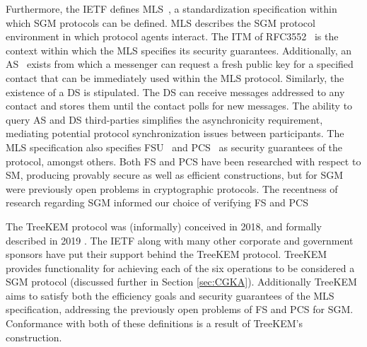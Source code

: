 \documentclass[runningheads]{llncs}
\newcommand{\Abrev}[1]{\gls{#1}}
\begin{document}
Furthermore, the \Abrev{IETF} defines \Abrev{MLS}\ \cite{Omara2020}, a standardization specification within which \Abrev{SGM} protocols can be defined.
\Abrev{MLS} describes the \Abrev{SGM} protocol environment in which protocol agents interact.
The \Abrev{ITM} of RFC3552~\cite{rescorla2003rfc3552} is the context within which the \Abrev{MLS} specifies its security guarantees.
Additionally, an \Abrev{AS}~\cite{perlman1999overview} exists from which a messenger can request a fresh public key for a specified contact that can be immediately used within the \Abrev{MLS} protocol.
Similarly, the existence of a \Abrev{DS} is stipulated. 
The \Abrev{DS} can receive messages addressed to any contact and stores them until the contact polls for new messages.
The ability to query \Abrev{AS} and \Abrev{DS} third-parties simplifies the asynchronicity requirement, mediating potential protocol synchronization issues between participants.
The \Abrev{MLS} specification also specifies \Abrev{FSU}~\cite{Omara2020} and \Abrev{PCS}~\cite{cohn2016post} as security guarantees of the protocol, amongst others.
Both \Abrev{FS} and \Abrev{PCS} have been researched with respect to \Abrev{SM}, producing provably secure as well as efficient constructions, but for \Abrev{SGM} were previously open problems in cryptographic protocols.
The recentness of research regarding \Abrev{SGM} informed our choice of verifying \Abrev{FS} and \Abrev{PCS} 

The TreeKEM protocol \cite{bhargavan:hal-02425247} was (informally) conceived in 2018, and formally described in 2019 \cite{ietf-mls-architecture-03}.
The \Abrev{IETF} along with many other corporate and government sponsors have put their support behind the TreeKEM protocol.
TreeKEM provides functionality for achieving each of the six operations to be considered a \Abrev{SGM} protocol (discussed further in Section \ref{sec:CGKA}).
Additionally TreeKEM aims to satisfy both the efficiency goals and security guarantees of the \Abrev{MLS} specification, addressing the previously open problems of \Abrev{FS} and \Abrev{PCS} for \Abrev{SGM}.
Conformance with both of these definitions is a result of TreeKEM's construction.
\end{document}
